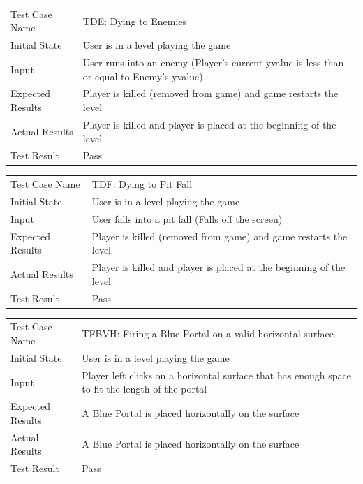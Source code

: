 \documentclass[12pt, titlepage]{article}
\begin{document}
\begin{center}
\begin{tabular}{ | l | p{10cm} | }
\hline
Test Case Name & TDE: Dying to Enemies	\\
Initial State & User is in a level playing the game	\\
Input & User runs into an enemy (Player's current yvalue is less than or equal to Enemy's yvalue)	\\
Expected Results & Player is killed (removed from game) and game restarts the level	\\
Actual Results & Player is killed and player is placed at the beginning of the level	\\
Test Result & Pass	\\
\hline
\end{tabular}
\end{center}

\begin{center}
\begin{tabular}{ | l | p{10cm} | }
\hline
Test Case Name & TDF: Dying to Pit Fall	\\
Initial State & User is in a level playing the game	\\
Input & User falls into a pit fall (Falls off the screen)	\\
Expected Results & Player is killed (removed from game) and game restarts the level	\\
Actual Results & Player is killed and player is placed at the beginning of the level	\\
Test Result & Pass	\\
\hline
\end{tabular}
\end{center}

\begin{center}
\begin{tabular}{ | l | p{10cm} | }
\hline
Test Case Name & TFBVH: Firing a Blue Portal on a valid horizontal surface	\\
Initial State & User is in a level playing the game	\\
Input & Player left clicks on a horizontal surface that has enough space to fit the length of the portal	\\
Expected Results & A Blue Portal is placed horizontally on the surface	\\
Actual Results & A Blue Portal is placed horizontally on the surface	\\
Test Result & Pass	\\
\hline
\end{tabular}
\end{center}
\end{document}
